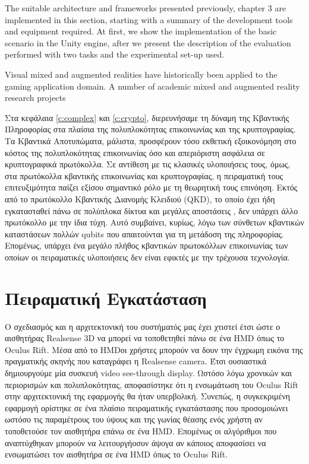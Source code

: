 

 \label{c:exper}

The suitable architecture and frameworks presented previously, chapter 3 are implemented in
this section, starting with a summary of the development tools and equipment required. At first,
we show the implementation of the basic scenario in the Unity engine, after we present the
description of the evaluation performed with two tasks and the experimental set-up used.

Visual mixed and augmented realities have historically been applied to the gaming application domain. A number of academic mixed and augmented reality
research projects

Στα κεφάλαια \ref{c:complex} και \ref{c:crypto}, διερευνήσαμε τη δύναμη της Κβαντικής Πληροφορίας στα πλαίσια της πολυπλοκότητας επικοινωνίας και της κρυπτογραφίας. Τα Κβαντικά Αποτυπώματα, μάλιστα, προσφέρουν τόσο εκθετική εξοικονόμηση στο κόστος της πολυπλοκότητας επικοινωνίας όσο και απεριόριστη ασφάλεια σε κρυπτογραφικά πρωτόκολλα. Σε αντίθεση με τις κλασικές υλοποιήσεις τους, όμως, στα πρωτόκολλα κβαντικής επικοινωνίας και κρυπτογραφίας, η πειραματική τους επιτευξιμότητα παίζει εξίσου σημαντικό ρόλο με τη θεωρητική τους επινόηση. Εκτός από το πρωτόκολλο Κβαντικής Διανομής Κλειδιού (QKD), το οποίο έχει ήδη εγκατασταθεί πάνω σε πολύπλοκα δίκτυα και μεγάλες αποστάσεις \cite{QKDexp1,QKDexp2}, δεν υπάρχει άλλο πρωτόκολλο με την ίδια τύχη. Αυτό συμβαίνει, κυρίως, λόγω των σύνθετων κβαντικών καταστάσεων πολλών qubits που απαιτούνται για τη μετάδοση της πληροφορίας. Επομένως, υπάρχει ένα μεγάλο πλήθος κβαντικών πρωτοκόλλων επικοινωνίας των οποίων οι πειραματικές υλοποιήσεις δεν είναι εφικτές με την τρέχουσα τεχνολογία.




\section{Πειραματική Εγκατάσταση}

Ο σχεδιασμός και η αρχιτεκτονική του συστήματός μας έχει χτιστεί έτσι ώστε ο αισθητήρας Realsense 3D να μπορεί να τοποθετηθεί πάνω σε ένα HMD όπως το Oculus Rift. Μέσα από το HMDοι χρήστες μπορούν να δουν την έγχρωμη εικόνα της πραγματικής σκηνής που καταγράφει η Realsense camera. Έτσι ουσιαστικά δημιουργούμε μία συσκευή video see-through display. Ωστόσο λόγω χρονικών και περιορισμών και πολυπλοκότητας, αποφασίστηκε ότι η ενσωμάτωση του Oculus Rift στην αρχιτεκτονική της εφαρμογής θα ήταν υπερβολική. Συνεπώς, η συγκεκριμένη εφαρμογή ορίστηκε σε ένα πλαίσιο πειραματικής εγκατάστασης που προσομοιώνει ωστόσο τις παραμέτρους του ύψους και της γωνίας θέασης ενός χρήστη αν τοποθετούσε τον αισθητήρα επάνω σε ένα HMD. Επομένως οι αλγόριθμοι που αναπτύχθηκαν μπορούν να λειτουργήοσυν άψογα αν κάποιος αποφασίσει να ενσωματώσει τον αισθητήρα σε ένα HMD όπως το Oculus Rift. 

